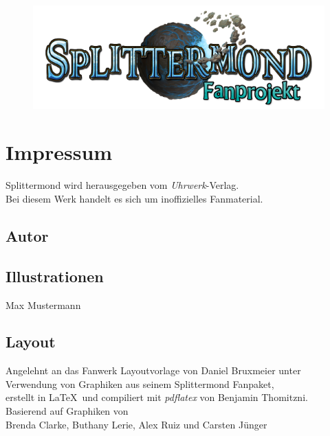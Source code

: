 \documentclass[12pt, a4paper, twoside, openany]{book}
\begin{document}
{%

        {%
            \begin{center}
                    \color{spmblue}
                    \fontsize{40}{50}
                    \selectfont
                    \textbf{\MyTitle}
            \end{center}
       }%
       \begin{figure}[t]
               \centering
               \includegraphics[scale=0.8]{bilder/Splittermond-Logo_fan_v2.png}
       \end{figure}
       
       \vfill
        \section*{Impressum}%
        \begin{center}
        Splittermond wird herausgegeben vom \textit{Uhrwerk}-Verlag.\\
        Bei diesem Werk handelt es sich um inoffizielles Fanmaterial.        
        \end{center}
        \subsection*{Autor}
        \begin{center} 
        \MyAuthor
        \end{center}
        \subsection*{Illustrationen}
        \begin{center}
        Max Mustermann        
        \end{center}

        \subsection*{Layout}
        \begin{center}
                Angelehnt an das Fanwerk Layoutvorlage von Daniel Bruxmeier unter Verwendung von Graphiken aus seinem Splittermond Fanpaket,\\ erstellt in \LaTeX ~und compiliert mit \textit{pdflatex} von Benjamin Thomitzni. \\
        Basierend auf Graphiken von \\ 
        Brenda Clarke, Buthany Lerie, Alex Ruiz und Carsten Jünger         
        \end{center}
}
\end{document}
